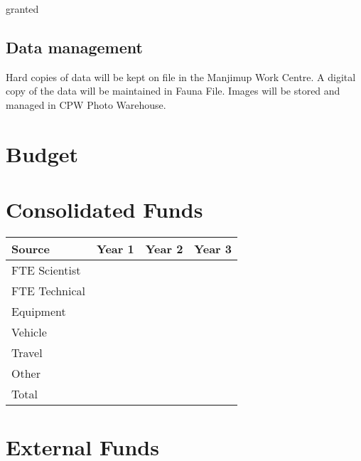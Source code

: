 \documentclass[version=last,
    paper=a4,                               %
    10pt,                                   %
    dvipsnames,
    oneside,                              %
    headings=openany,                       %
    open=any,
    BCOR=7mm,                               %
    DIV=15,     %
]{scrbook}
\begin{document}
granted




\subsection*{Data management}

Hard copies of data will be kept on file in the Manjimup Work Centre. A
digital copy of the data will be maintained in Fauna File. Images will
be stored and managed in CPW Photo Warehouse.




\section*{Budget}

\section*{Consolidated Funds }



\begin{longtabu} to \linewidth { |  X | X | X | X | }
\hline
{}
Source & Year 1 & Year 2 & Year 3\\
\hline
\endhead



FTE Scientist &  &  & \\



FTE Technical &  &  & \\



Equipment &  &  & \\



Vehicle &  &  & \\



Travel &  &  & \\



Other &  &  & \\



Total &  &  & \\


\hline
\end{longtabu}



\section*{External Funds }
\end{document}
